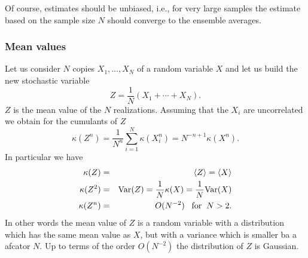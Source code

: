 Of course, estimates should be unbiased, i.e., for very large samples
the estimate based on the sample size $N$ should converge to the
ensemble averages.

\subsubsection{Mean values}
Let us consider $N$ copies $X_1, \ldots, X_N$  of a random variable
$X$ and let us build the new stochastic variable
\begin{equation*}
Z = \frac{1}{N}(X_1 + \cdots + X_N).
\end{equation*}
$Z$ is the mean value of the $N$ realizations. Assuming that the $X_i$
are uncorrelated we obtain for the cumulants of $Z$
\begin{equation*}
\kappa(Z^n) = \frac{1}{N^n} \sum_{i=1}^N \kappa(X_i^n) =
      N^{-n+1}  \kappa(X^n).
\end{equation*}
In particular we have
\begin{eqnarray*}
\kappa(Z) & = & \langle Z \rangle = \langle X \rangle \\
\kappa(Z^2) & = & {\rm Var}(Z) = \frac{1}{N} \kappa(X) = \frac{1}{N}
                  {\rm Var}(X) \\
\kappa(Z^n) & = & O(N^{-2}) \;\;\; {\rm for} \;\; N>2.
\end{eqnarray*}
In other words the mean value of $Z$ is a random variable with a
distribution which has the same mean value as $X$, but with a variance
which is smaller ba a afcator $N$. Up to terms of the order
$O(N^{-2})$ the distribution of $Z$ is Gaussian.

